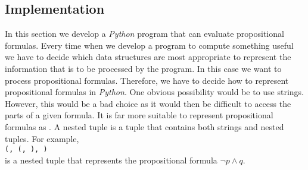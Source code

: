 \subsection{Implementation} 
In this section we develop a \textsl{Python} program that can evaluate propositional formulas.
Every time when we develop a program to compute something useful we have to decide which data structures are
most appropriate to represent the information that is to be processed by the program.  In this case we want to
process propositional formulas.  Therefore, we have to decide how to represent propositional formulas in
\textsl{Python}.  One obvious possibility would be to use strings.  However, this would be a bad choice as it
would then be difficult to access the parts of a given formula.  It is far more suitable to represent
propositional formulas as .  A nested tuple is a tuple that contains both strings and
nested tuples.  For example,
\\[0.2cm]
\hspace*{1.3cm}
\texttt{(\tsq{$\wedge$}, (\tsq{$\neg$}, ), )}
\\[0.2cm]
is a nested tuple that represents the propositional formula $\neg p \wedge q$.

